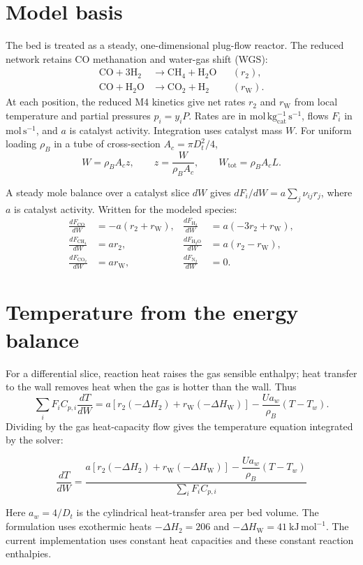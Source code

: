\documentclass[10pt,a4paper]{article}
\begin{document}
\section{Model basis}
The bed is treated as a steady, one-dimensional plug-flow reactor. The reduced network retains CO methanation and water-gas shift (WGS):
\[
\begin{aligned}
\mathrm{CO+3H_2} &\longrightarrow \mathrm{CH_4+H_2O} && (r_2),\\
\mathrm{CO+H_2O} &\longrightarrow \mathrm{CO_2+H_2} && (r_{\mathrm W}).
\end{aligned}
\]
At each position, the reduced M4 kinetics give net rates \(r_2\) and \(r_{\mathrm W}\) from local temperature and partial pressures \(p_i=y_iP\). Rates are in \(\mathrm{mol\,kg_{cat}^{-1}\,s^{-1}}\), flows \(F_i\) in \(\mathrm{mol\,s^{-1}}\), and \(a\) is catalyst activity. Integration uses catalyst mass \(W\). For uniform loading \(\rho_B\) in a tube of cross-section \(A_c=\pi D_t^2/4\),
\[
W=\rho_B A_c z,\qquad z=\frac{W}{\rho_B A_c},\qquad W_{\mathrm{tot}}=\rho_B A_cL.
\]

A steady mole balance over a catalyst slice \(dW\) gives \(dF_i/dW=a\sum_j\nu_{ij}r_j\), where \(a\) is catalyst activity. Written for the modeled species:
\[
\begin{aligned}
\frac{dF_{\mathrm{CO}}}{dW}&=-a(r_2+r_{\mathrm W}), &
\frac{dF_{\mathrm{H_2}}}{dW}&=a(-3r_2+r_{\mathrm W}),\\
\frac{dF_{\mathrm{CH_4}}}{dW}&=ar_2, &
\frac{dF_{\mathrm{H_2O}}}{dW}&=a(r_2-r_{\mathrm W}),\\
\frac{dF_{\mathrm{CO_2}}}{dW}&=ar_{\mathrm W}, &
\frac{dF_{\mathrm{N_2}}}{dW}&=0.
\end{aligned}
\]

\section{Temperature from the energy balance}
For a differential slice, reaction heat raises the gas sensible enthalpy; heat transfer to the wall removes heat when the gas is hotter than the wall. Thus
\[
\sum_i F_iC_{p,i}\frac{dT}{dW}
=a\left[r_2(-\Delta H_2)+r_{\mathrm W}(-\Delta H_{\mathrm W})\right]
-\frac{Ua_w}{\rho_B}(T-T_w).
\]
Dividing by the gas heat-capacity flow gives the temperature equation integrated by the solver:
\begin{keyequation}
\[
\boxed{\displaystyle
\frac{dT}{dW}=
\frac{a\left[r_2(-\Delta H_2)+r_{\mathrm W}(-\Delta H_{\mathrm W})\right]
-\dfrac{Ua_w}{\rho_B}(T-T_w)}{\sum_iF_iC_{p,i}}}
\]
\end{keyequation}
Here \(a_w=4/D_t\) is the cylindrical heat-transfer area per bed volume. The formulation uses exothermic heats \(-\Delta H_2=206\) and \(-\Delta H_{\mathrm W}=41\ \mathrm{kJ\,mol^{-1}}\). The current implementation uses constant heat capacities and these constant reaction enthalpies.
\end{document}
